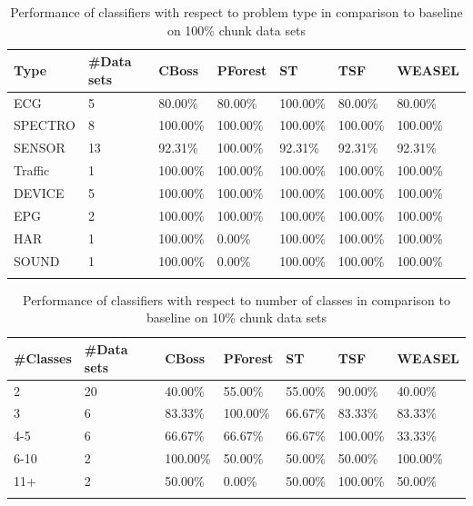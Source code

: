 \begin{table}[!htb]
	\setlength\extrarowheight{2pt} %
	\begin{tabularx}{\textwidth}{|X|X|X|X|X|X|X|}
	\hline
	\textbf{Type} & \textbf{\#Data sets} & \textbf{CBoss} & \textbf{PForest} & \textbf{ST} & \textbf{TSF} & \textbf{WEASEL} \\ \hline
		ECG & 5 & 80.00\% & 80.00\% & 100.00\% & 80.00\% & 80.00\% \\ \hline
		SPECTRO & 8 &100.00\% & 100.00\% & 100.00\% & 100.00\% & 100.00\% \\ \hline
		SENSOR & 13 & 92.31\% & 100.00\% & 92.31\% & 92.31\% & 92.31\% \\ \hline
		Traffic & 1 & 100.00\% & 100.00\% & 100.00\% & 100.00\% & 100.00\% \\ \hline
		DEVICE & 5 & 100.00\% & 100.00\% & 100.00\% & 100.00\% & 100.00\% \\ \hline
		EPG & 2 & 100.00\% & 100.00\% & 100.00\% & 100.00\% & 100.00\% \\ \hline
		HAR & 1 & 100.00\% & 0.00\% & 100.00\% & 100.00\% & 100.00\% \\ \hline
		SOUND & 1 & 100.00\% & 0.00\% & 100.00\% & 100.00\% & 100.00\% \\ \hline
  \caption{Performance of classifiers with respect to problem type in comparison to baseline on 100\% chunk data sets}
  \end{tabularx}
\end{table}


\begin{table}[!htb]
	\setlength\extrarowheight{2pt} %
	\begin{tabularx}{\textwidth}{|X|X|X|X|X|X|X|}
	\hline
	\textbf{\#Classes} & \textbf{\#Data sets} & \textbf{CBoss} & \textbf{PForest} & \textbf{ST} & \textbf{TSF} & \textbf{WEASEL} \\ \hline
		2 & 20 & 40.00\% & 55.00\% & 55.00\% & 90.00\% & 40.00\% \\ \hline
		3 & 6 & 83.33\% & 100.00\% & 66.67\% & 83.33\% & 83.33\% \\ \hline
		4-5 & 6 & 66.67\% & 66.67\% & 66.67\% & 100.00\% & 33.33\% \\ \hline
		6-10 & 2 & 100.00\% & 50.00\% & 50.00\% & 50.00\% & 100.00\% \\ \hline
		11+ & 2 & 50.00\% & 0.00\% & 50.00\% & 100.00\% & 50.00\% \\ \hline
  \caption{Performance of classifiers with respect to number of classes in comparison to baseline on 10\% chunk data sets}
  \end{tabularx}
\end{table}

